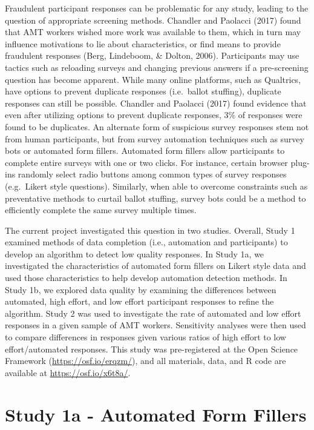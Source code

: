 \documentclass[english,man]{apa6}
\theoremstyle{definition}
\theoremstyle{definition}
\theoremstyle{definition}
\theoremstyle{remark}
\begin{document}
Fraudulent participant responses can be problematic for any study,
leading to the question of appropriate screening methods. Chandler and
Paolacci (2017) found that AMT workers wished more work was available to
them, which in turn may influence motivations to lie about
characteristics, or find means to provide fraudulent responses (Berg,
Lindeboom, \& Dolton, 2006). Participants may use tactics such as
reloading surveys and changing previous answers if a pre-screening
question has become apparent. While many online platforms, such as
Qualtrics, have options to prevent duplicate responses (i.e.~ballot
stuffing), duplicate responses can still be possible. Chandler and
Paolacci (2017) found evidence that even after utilizing options to
prevent duplicate responses, 3\% of responses were found to be
duplicates. An alternate form of suspicious survey responses stem not
from human participants, but from survey automation techniques such as
survey bots or automated form fillers. Automated form fillers allow
participants to complete entire surveys with one or two clicks. For
instance, certain browser plug-ins randomly select radio buttons among
common types of survey responses (e.g.~Likert style questions).
Similarly, when able to overcome constraints such as preventative
methods to curtail ballot stuffing, survey bots could be a method to
efficiently complete the same survey multiple times.

The current project investigated this question in two studies. Overall,
Study 1 examined methods of data completion (i.e., automation and
participants) to develop an algorithm to detect low quality responses.
In Study 1a, we investigated the characteristics of automated form
fillers on Likert style data and used those characteristics to help
develop automation detection methods. In Study 1b, we explored data
quality by examining the differences between automated, high effort, and
low effort participant responses to refine the algorithm. Study 2 was
used to investigate the rate of automated and low effort responses in a
given sample of AMT workers. Sensitivity analyses were then used to
compare differences in responses given various ratios of high effort to
low effort/automated responses. This study was pre-registered at the
Open Science Framework (\url{https://osf.io/erqzm/}), and all materials,
data, and R code are available at \url{https://osf.io/x6t8a/}.

\section{Study 1a - Automated Form
Fillers}\label{study-1a---automated-form-fillers}
\end{document}
